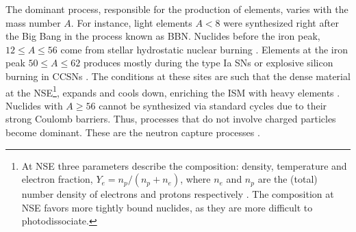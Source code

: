 The dominant \nuc{} process, responsible for the production of elements, varies with the mass 
number $A$.
%
For instance, light elements $A<8$ were synthesized right after the Big Bang
in the process known as \ac{BBN}.
Nuclides before the iron peak, $12\leq A\leq 56$ come from stellar hydrostatic 
nuclear burning \citep[\eg][]{Rolfs:1988,Hasen:2004}.
Elements at the iron peak $50\leq A \leq 62$ produces mostly 
during the type Ia \acp{SN} or explosive silicon burning in \acp{CCSN} \citep[\eg]{Woosley:2002}. 
The conditions at these sites are such that the dense material at the \ac{NSE}\footnote{
    At \ac{NSE} three parameters describe the composition: 
    density, temperature and electron fraction, $Y_e = n_p/(n_p + n_e)$, 
    where $n_e$ and $n_p$ are the (total) number density of electrons and protons 
    respectively \citep{Seitenzahl:2009}. 
    The composition at \ac{NSE} favors more tightly bound nuclides,
    as they are more difficult to photodissociate.
}, 
expands and cools down, enriching the \ac{ISM} with heavy elements \citep{Iwamoto:2000as}. 
%
Nuclides with $A\geq 56$ cannot be synthesized via standard cycles due to their 
strong Coulomb barriers. 
Thus, processes that do not involve charged particles become dominant. 
These are the neutron capture processes \citep{Burbidge:1957}.



